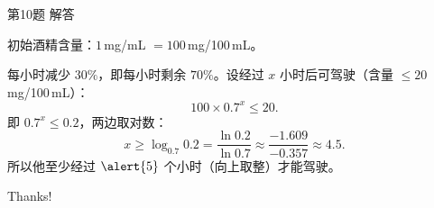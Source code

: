 \documentclass[10pt,aspectratio=169,serif]{beamer}
\begin{document}
\begin{frame}[t]{第10题 解答}
\begin{tcolorbox}[colback=orange!10,colframe=orange,title=\textbf{解}]
初始酒精含量：$1$\,mg/mL $= 100$\,mg/100\,mL。

每小时减少 $30\%$，即每小时剩余 $70\%$。设经过 $x$ 小时后可驾驶（含量 $\leq 20$\,mg/100\,mL）：
\[
100 \times 0.7^x \leq 20.
\]
即 $0.7^x \leq 0.2$，两边取对数：
\[
x \geq \log_{0.7} 0.2 = \frac{\ln 0.2}{\ln 0.7} \approx \frac{-1.609}{-0.357} \approx 4.5.
\]
所以他至少经过 $\alert{5}$ 个小时（向上取整）才能驾驶。
\end{tcolorbox}
\end{frame}

\begin{frame}[c]
  \begin{center}
    {\Huge\calligra Thanks!}
  \end{center}
\end{frame}
\end{document}
